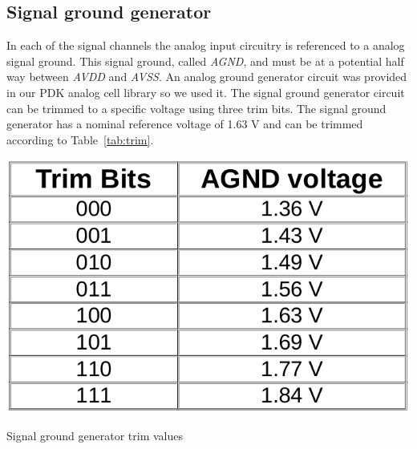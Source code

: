 \documentclass[12pt,oneside,final]{siuethesis}
\theoremstyle{definition}
\begin{document}
\subsection{Signal ground generator}
\par In each of the signal channels the analog input circuitry is referenced to a analog signal ground. This signal ground, called \emph{AGND}, and must be at a potential half way between \emph{AVDD} and \emph{AVSS}. An analog ground generator circuit was provided in our PDK analog cell library so we used it. The signal ground generator circuit can be trimmed to a specific voltage using three trim bits. The signal ground generator has a nominal reference voltage of 1.63 V and can be trimmed according to Table~\ref{tab:trim}.

\begin{table}[htbp!]
 \centering
 \includegraphics[scale=.30,keepaspectratio=true]{./ch3_figures/trim.png}
 \caption{Signal ground generator trim values}
 \label{tab:trim}
\end{table}
\end{document}
